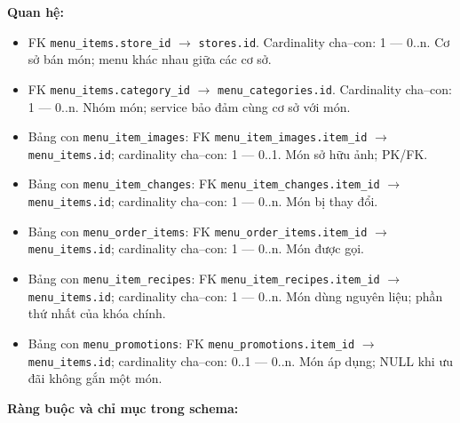 \textbf{Quan hệ:}

\begin{itemize}

\item FK \texttt{menu\_items.store\_id} $\rightarrow$ \texttt{stores.id}. Cardinality cha--con: 1 — 0..n. Cơ sở bán món; menu khác nhau giữa các cơ sở.

\item FK \texttt{menu\_items.category\_id} $\rightarrow$ \texttt{menu\_categories.id}. Cardinality cha--con: 1 — 0..n. Nhóm món; service bảo đảm cùng cơ sở với món.

\item Bảng con \texttt{menu\_item\_images}: FK \texttt{menu\_item\_images.item\_id} $\rightarrow$ \texttt{menu\_items.id}; cardinality cha--con: 1 — 0..1. Món sở hữu ảnh; PK/FK.

\item Bảng con \texttt{menu\_item\_changes}: FK \texttt{menu\_item\_changes.item\_id} $\rightarrow$ \texttt{menu\_items.id}; cardinality cha--con: 1 — 0..n. Món bị thay đổi.

\item Bảng con \texttt{menu\_order\_items}: FK \texttt{menu\_order\_items.item\_id} $\rightarrow$ \texttt{menu\_items.id}; cardinality cha--con: 1 — 0..n. Món được gọi.

\item Bảng con \texttt{menu\_item\_recipes}: FK \texttt{menu\_item\_recipes.item\_id} $\rightarrow$ \texttt{menu\_items.id}; cardinality cha--con: 1 — 0..n. Món dùng nguyên liệu; phần thứ nhất của khóa chính.

\item Bảng con \texttt{menu\_promotions}: FK \texttt{menu\_promotions.item\_id} $\rightarrow$ \texttt{menu\_items.id}; cardinality cha--con: 0..1 — 0..n. Món áp dụng; NULL khi ưu đãi không gắn một món.

\end{itemize}

\textbf{Ràng buộc và chỉ mục trong schema:}

